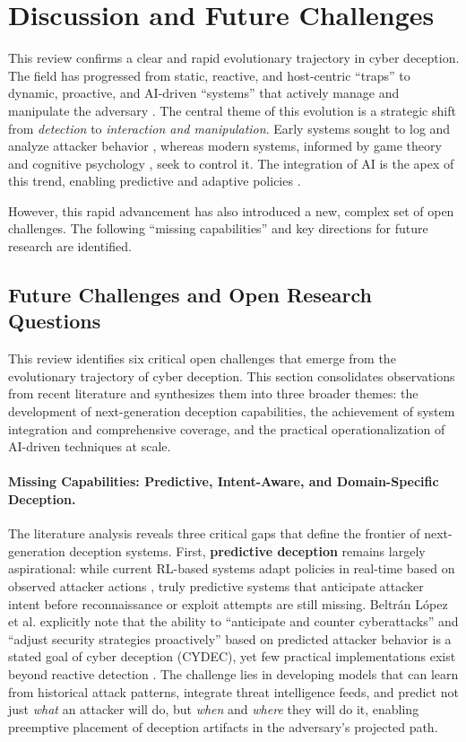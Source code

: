 \section{Discussion and Future Challenges} \label{sec:discussion}

This review confirms a clear and rapid evolutionary trajectory in cyber deception.
The field has progressed from static, reactive, and host-centric ``traps''
\cite{spitzner2002honeypots,provos2004virtual} to dynamic, proactive, and AI-driven
``systems'' that actively manage and manipulate the adversary \cite{hammad2024deep}.
The central theme of this evolution is a strategic shift from \textit{detection}
to \textit{interaction and manipulation}. Early systems sought to log and analyze
attacker behavior \cite{nawrocki2016survey}, whereas modern systems, informed by
game theory \cite{pawlick2019game,schlenker2018deceiving} and cognitive psychology
\cite{ferguson2021examining}, seek to control it. The integration of AI is the apex
of this trend, enabling predictive and adaptive policies \cite{hammad2024deep}.

However, this rapid advancement has also introduced a new, complex set of open
challenges. The following ``missing capabilities'' and key directions for future
research are identified.

\subsection{Future Challenges and Open Research Questions}

This review identifies six critical open challenges that emerge from the evolutionary trajectory of cyber deception.
This section consolidates observations from recent literature and synthesizes them into three broader themes: the development
of next-generation deception capabilities, the achievement of system integration and comprehensive coverage, and the practical
operationalization of AI-driven techniques at scale.
\paragraph{Missing Capabilities: Predictive, Intent-Aware, and Domain-Specific Deception.}
The literature analysis reveals three critical gaps that define the frontier of next-generation deception systems.
First, \textbf{predictive deception} remains largely aspirational: while current RL-based systems adapt policies in
real-time based on observed attacker actions \cite{hammad2024deep}, truly predictive systems that anticipate attacker
intent before reconnaissance or exploit attempts are still missing. Beltrán López et al. explicitly note that the
ability to ``anticipate and counter cyberattacks'' and ``adjust security strategies proactively'' based on predicted
attacker behavior is a stated goal of cyber deception (CYDEC), yet few practical implementations exist beyond reactive
detection \cite{deceptiontrends2024}. The challenge lies in developing models that can learn from historical attack
patterns, integrate threat intelligence feeds, and predict not just \textit{what} an attacker will do,
but \textit{when} and \textit{where} they will do it, enabling preemptive placement of deception artifacts
in the adversary's projected path.

